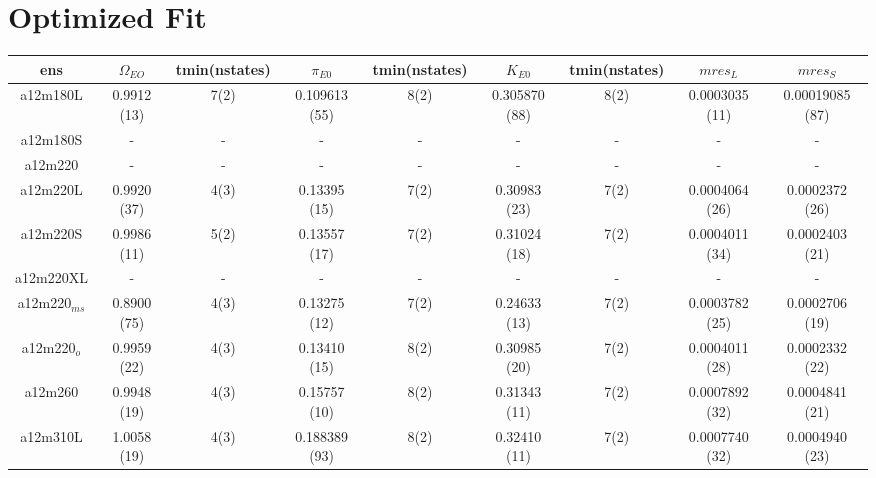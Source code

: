 \documentclass{article}
\begin{document}
\section*{Optimized Fit}
\begin{table}[h!]
  \centering
 \setlength{\arrayrulewidth}{0.5mm}
\setlength{\tabcolsep}{13pt}
\renewcommand{\arraystretch}{2}
 \begin{tabular}{|| c |c | c | c | c | c | c | c | c ||} 
 \hline
 ens &  $\Omega_{EO}$ & tmin(nstates) & $\pi_{E0}$  & tmin(nstates)& $K_{E0}$  & tmin(nstates) & $mres_{L}$ & $mres_{S}$\\ [0.8ex] 
 \hline\hline
 a12m180L 
 & {0.9912 (13)}   &   {7(2)} & {0.109613 (55)}   & {8(2)}   & {0.305870 (88)}  & {8(2)}   & {0.0003035 (11)}  & {0.00019085 (87)}  \\ 
 \hline
 a12m180S 
 & {-}   &   {-} & {-}   & {-}   & {-}  & {-}   & {-}  & {-}  \\
 \hline
 a12m220 
 & {-}   &   {-} & {-}   & {-}   & {-}  & {-}   & {-}  & {-}  \\
 \hline
 a12m220L 
 & {0.9920 (37)}   &   {4(3)} & {0.13395 (15)}   & {7(2)}   & {0.30983 (23)}  & {7(2)}   & {0.0004064 (26)}  & {0.0002372 (26)}  \\
 \hline
 a12m220S
 & {0.9986 (11)}   &   {5(2)} & {0.13557 (17)}   & {7(2)}   & {0.31024 (18)}  & {7(2)}   & {0.0004011 (34)}  & {0.0002403 (21)}  \\
 \hline
 a12m220XL
 & {-}   &   {-} & {-}   & {-}   & {-}  & {-}   & {-}  & {-}  \\
 \hline
 a12m220$_{ms}$
 & {0.8900 (75)}   &   {4(3)} & {0.13275 (12)}   & {7(2)}   & {0.24633 (13)}  & {7(2)}   & {0.0003782 (25)}  & {0.0002706 (19)}  \\
 \hline
 a12m220$_o$ 
 & {0.9959 (22)}   &   {4(3)} & {0.13410 (15)}   & {8(2)}   & {0.30985 (20)}  & {7(2)}   & {0.0004011 (28)}  & {0.0002332 (22)}  \\
 \hline
 a12m260 
 & {0.9948 (19)}   &   {4(3)} & {0.15757 (10)}   & {8(2)}   & {0.31343 (11)}  & {7(2)}   & {0.0007892 (32)}  & {0.0004841 (21)}  \\
 \hline

 a12m310L
 & {1.0058 (19)}   &   {4(3)} & {0.188389 (93)}   & {8(2)}   & {0.32410 (11)}  & {7(2)}   & {0.0007740 (32)}  & {0.0004940 (23)}  \\
 \hline
 
 
 \end{tabular}
\end{table}
\clearpage
\end{document}

